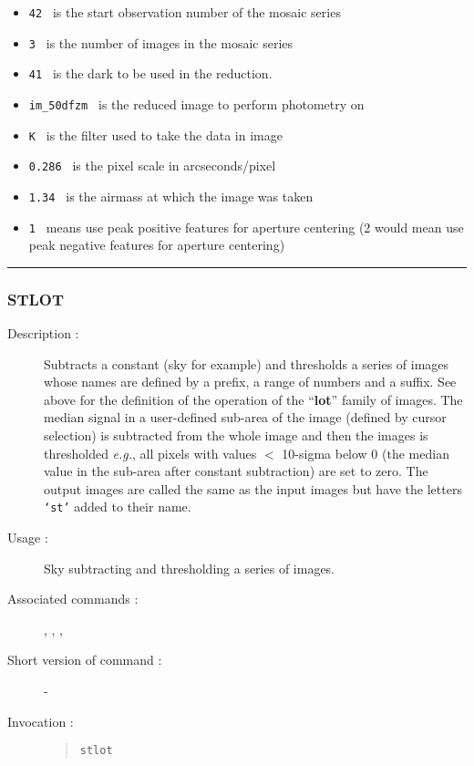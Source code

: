 \begin{description}
\begin{itemize}
\item {\tt 42 } is the start observation number of the mosaic series
\item {\tt 3 } is the number of images in the mosaic series
\item {\tt 41 } is the dark to be used in the reduction.
\item {\tt im\_50dfzm } is the reduced image to perform photometry on
\item {\tt K } is the filter used to take the data in image
\item {\tt 0.286 } is the pixel scale in arcseconds/pixel
\item {\tt 1.34 } is the airmass at which the image was taken
\item {\tt 1 } means use peak positive features for aperture centering
(2 would mean use peak negative features for aperture centering)
\end{itemize}

\end{description}

\hrule 
\subsubsection*{\label{STLOT}STLOT}

\begin{description}

\item[Description :] Subtracts a constant (sky for example) and
thresholds a series of images whose names are defined by a prefix, a
range of numbers and a suffix. See above for the definition of the
operation of the ``{\bf lot}'' family of images.  The median signal in
a user-defined sub-area of the image (defined by cursor selection) is
subtracted from the whole image and then the images is thresholded
\emph{e.g.}, all pixels with values $<$ 10-sigma below 0 (the median
value in the sub-area after constant subtraction) are set to zero.  The
output images are called the same as the input images but have the
letters {\tt `st'} added to their name.

\item[Usage :] Sky subtracting and thresholding a series of images.

\item[Associated commands :] {\tt {}}, 
{\tt {}}, {\tt {}}, 
{\tt {}}

\item[Short version of command :] -
\item[Invocation :]

\begin{quote}{\tt  stlot }\end{quote}

\end{description}

